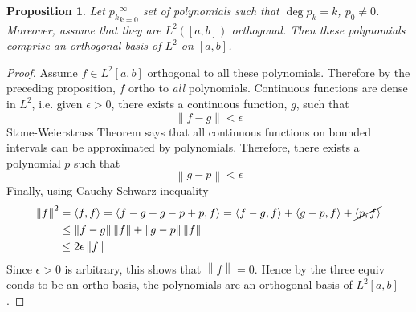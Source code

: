\documentclass{article}
\newtheorem{proposition}{Proposition}
\newcommand{\norm}[1]{\left\lVert#1\right\rVert}
\DeclareMathOperator{\Deg}{deg}
\begin{document}
\begin{proposition}
	Let ${p_k}_{k=0}^\infty$ set of polynomials such that $\Deg p_k = k$, $p_0 \ne 0$.
	Moreover, assume that they are $L^2([a, b])$ orthogonal.
	Then these polynomials comprise an orthogonal basis of $L^2$ on $[a, b]$.
\end{proposition}
\begin{proof}
	Assume $f \in L^2[a, b]$ orthogonal to all these polynomials.
	Therefore by the preceding proposition, $f$ ortho to \emph{all} polynomials.
	Continuous functions are dense in $L^2$, i.e. given $\epsilon > 0$,
	there exists a continuous function, $g$, such that
	$$ \norm{f - g} < \epsilon $$
	Stone-Weierstrass Theorem says that all continuous functions on bounded intervals
	can be approximated by polynomials.
	Therefore, there exists a polynomial $p$ such that
	$$ \norm{g - p} < \epsilon $$
	Finally, using Cauchy-Schwarz inequality
	\begin{align*}
		\norm{f}^2 &= \langle f, f \rangle = \langle f - g + g - p + p, f \rangle
		= \langle f - g, f \rangle + \langle g - p, f \rangle + \cancel{\langle p, f \rangle} \\
		&\le \norm{f - g} \norm f + \norm{g - p} \norm f \\
		&\le 2 \epsilon \norm f
	\end{align*}
	Since $\epsilon > 0$ is arbitrary, this shows that $\norm f = 0$.
	Hence by the three equiv conds to be an ortho basis,
	the polynomials are an orthogonal basis of $L^2[a, b]$.
\end{proof}
\end{document}
